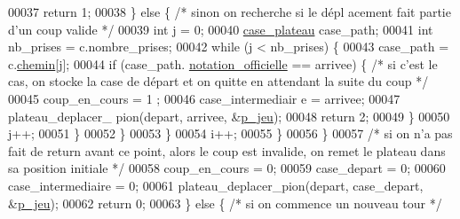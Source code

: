 \begin{DoxyCode}
00037                                                 \textcolor{keywordflow}{return} 1;
00038                                         \} \textcolor{keywordflow}{else} \{ \textcolor{comment}{/* sinon on recherche si le dépl
      acement fait partie d'un coup valide */}
00039                                                 \textcolor{keywordtype}{int} j = 0;
00040                                                 \hyperlink{structcase__plateau}{case_plateau} case\_path;
00041                                                 \textcolor{keywordtype}{int} nb\_prises = c.nombre\_prises;
00042                                                 \textcolor{keywordflow}{while} (j < nb\_prises) \{
00043                                                         case\_path = c.\hyperlink{structcoup_aa66b88eb8140c2f459ac92fad0796510}{chemin}[j];
00044                                                         \textcolor{keywordflow}{if} (case\_path.
      \hyperlink{structcase__plateau_ad510581b324604a9cf685cbb769a421a}{notation_officielle} == arrivee) \{ \textcolor{comment}{/* si c'est le cas, on stocke la case de départ
       et on quitte en attendant la suite du coup */}
00045                                                                 coup\_en\_cours = 1
      ;
00046                                                                 case\_intermediair
      e = arrivee;
00047                                                                 plateau\_deplacer\_
      pion(depart, arrivee, &\hyperlink{moteur_8h_a3efa8d0f7c65daedc584dc8db048e62c}{p_jeu});
00048                                                                 \textcolor{keywordflow}{return} 2;
00049                                                         \}
00050                                                         j++;
00051                                                 \}
00052                                         \}
00053                                 \}
00054                                 i++;
00055                         \}
00056                 \}
00057                 \textcolor{comment}{/* si on n'a pas fait de return avant ce point, alors le coup est
       invalide, on remet le plateau dans sa position initiale */}
00058                 coup\_en\_cours = 0;
00059                 case\_depart = 0;
00060                 case\_intermediaire = 0;
00061                 plateau\_deplacer\_pion(depart, case\_depart, &\hyperlink{moteur_8h_a3efa8d0f7c65daedc584dc8db048e62c}{p_jeu});
00062                 \textcolor{keywordflow}{return} 0;
00063         \} \textcolor{keywordflow}{else} \{ \textcolor{comment}{/* si on commence un nouveau tour */}

\end{DoxyCode}
